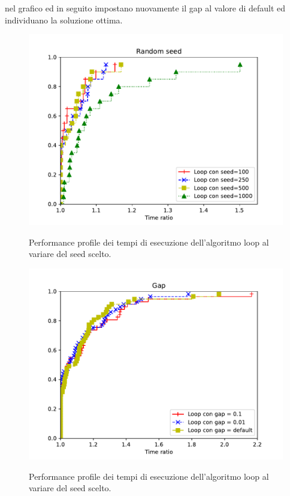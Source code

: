 nel grafico ed in seguito impostano nuovamente il gap al valore di default ed individuano la soluzione ottima.
\begin{figure}[H] 
\begin{center} 
  \includegraphics[scale=0.7]{Images/pp_random_seed}\\ 
  \caption{\footnotesize{Performance profile dei tempi di esecuzione dell'algoritmo loop al variare del seed scelto.}}
  \label{pp_random_seed} 
\end{center} 
\end{figure}
\begin{figure}[H] 
\begin{center} 
  \includegraphics[scale=0.7]{Images/pp_gap}\\ 
  \caption{\footnotesize{Performance profile dei tempi di esecuzione dell'algoritmo loop al variare del seed scelto.}}
  \label{pp_gap} 
\end{center} 
\end{figure}

